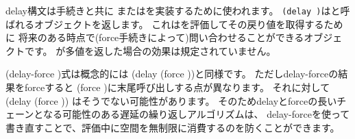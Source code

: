 \begin{entry}{%
}


\semantics
{\cf delay}構文は手続きと共に
またはを実装するために使われます。
{\tt(delay~)}はと呼ばれるオブジェクトを返します。
これはを評価してその戻り値を取得するために
将来のある時点で({\cf force}手続きによって)問い合わせることができるオブジェクトです。
が多値を返した場合の効果は規定されていません。

\end{entry}

\begin{entry}{%
}


\semantics
{\cf (delay-force )}式は概念的には
{\cf (delay (force ))}と同様です。
ただし{\cf delay-force}の結果をforceすると
{\cf (force )}に末尾呼び出しする点が異なります。
それに対して
{\cf (delay (force ))}
はそうでない可能性があります。
そのため{\cf delay}と{\cf force}の長いチェーンとなる可能性のある遅延の繰り返しアルゴリズムは、
{\cf delay-force}を使って書き直すことで、評価中に空間を無制限に消費するのを防くことができます。

\end{entry}

